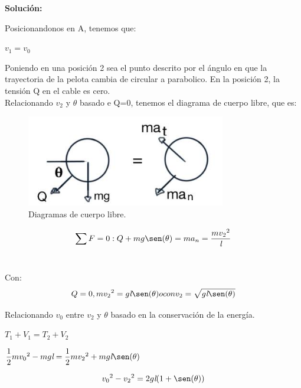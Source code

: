 \documentclass[a4paper,11pt]{scrartcl}
\begin{document}
\textbf{Solución:}

\begin{center}

Posicionandonos en A, tenemos que: \\
\begin{center}
$v_{1} = v_{0}  $ \\
\end{center}

Poniendo en una posición 2 sea el punto descrito por el ángulo en que la trayectoria de la pelota cambia de circular a parabolico. En la posición 2, la tensión Q en el cable es cero.\\
Relacionando $v_{2}$ y $\theta$ basado e Q=0, tenemos el diagrama de cuerpo libre, que es:\\

\begin{figure}[H]
  \centering
  \includegraphics[height=4cm]{Extra_2}
  \caption{Diagramas de cuerpo libre.}
  \label{fig:Extra_2}
\end{figure}

\begin{center}
\[
\sum F= 0: Q + mg \sen(\theta) = ma_{n} = \dfrac{m{v_{2}}^{2}}{\emph{l}}
\] \\
\end{center}

Con:\\
\begin{equation}
 Q = 0, m{v_{2}}^{2} = g\emph{l}\sen(\theta)  o con v_{2} = \sqrt{g\emph{l}\sen(\theta)}
\end{equation}

Relacionando $v_{0}$ entre $v_{2}$ y $\theta$ basado en la conservación de la energía. \\

\begin{center}
$T_{1} + V_{1} = T_{2} + V_{2}$\\
\end{center}
\begin{center}
$\dfrac{1}{2}m{v_{0}}^{2} - mg\emph{l} = \dfrac{1}{2}m{v_{2}}^{2} + mg\emph{l}\sen(\theta) $\\
\end{center}
\begin{center}
\begin{equation}
{v_{0}}^{2} - {v_{2}}^{2} = 2g\emph{l}(1 + \sen(\theta))
\end{equation}
\end{center}


\end{center}
\end{document}
